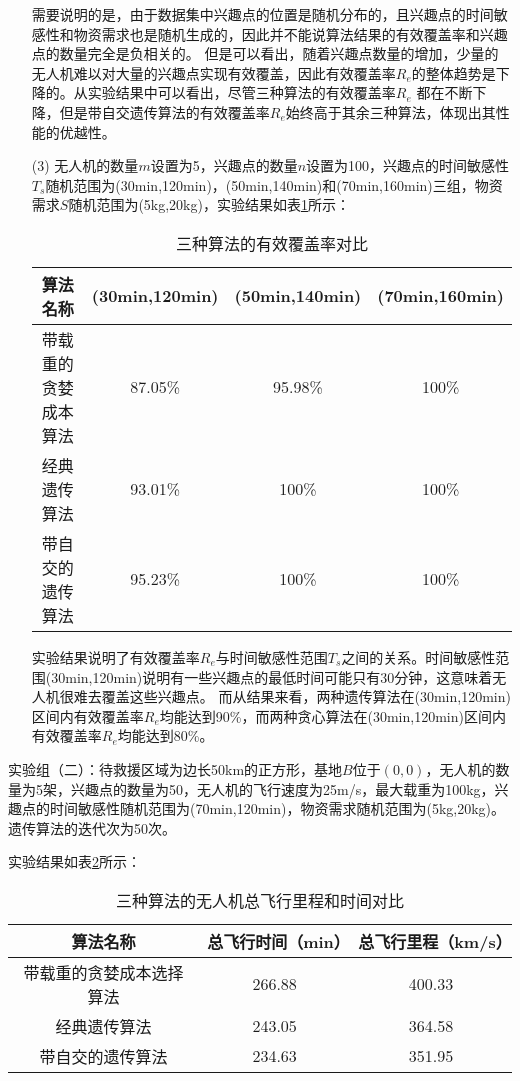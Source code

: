 \begin{itemize}
\begin{figure}[H]
        \label{fg502}
    \end{figure}
    需要说明的是，由于数据集中兴趣点的位置是随机分布的，且兴趣点的时间敏感性和物资需求也是随机生成的，因此并不能说算法结果的有效覆盖率和兴趣点的数量完全是负相关的。
    但是可以看出，随着兴趣点数量的增加，少量的无人机难以对大量的兴趣点实现有效覆盖，因此有效覆盖率$R_e$的整体趋势是下降的。从实验结果中可以看出，尽管三种算法的有效覆盖率$R_e$
    都在不断下降，但是带自交遗传算法的有效覆盖率$R_e$始终高于其余三种算法，体现出其性能的优越性。
    \item [(3)]无人机的数量$m$设置为5，兴趣点的数量$n$设置为100，兴趣点的时间敏感性$T_s$随机范围为(30min,120min)，(50min,140min)和(70min,160min)三组，物资需求$S$随机范围为(5kg,20kg)，实验结果如表\ref{table2}所示：
    \begin{table}[htbp]
        \vspace{0.5em}\centering\wuhao
        \caption{三种算法的有效覆盖率对比}\label{table2}
        \begin{tabular}{cccc}
        \toprule[1.5pt]
        算法名称 & (30min,120min) & (50min,140min) & (70min,160min) \\
        \midrule[1.5pt]
        带载重的贪婪成本 算法 & 87.05\% & 95.98\% & 100\%\\
        经典遗传算法 & 93.01\% & 100\% & 100\% \\
        带自交的遗传算法 & 95.23\% & 100\% & 100\% \\
        \bottomrule[1.5pt]
        \end{tabular}
        \end{table}
    
    
        实验结果说明了有效覆盖率$R_e$与时间敏感性范围$T_s$之间的关系。时间敏感性范围(30min,120min)说明有一些兴趣点的最低时间可能只有30分钟，这意味着无人机很难去覆盖这些兴趣点。
    而从结果来看，两种遗传算法在(30min,120min)区间内有效覆盖率$R_e$均能达到90\%，而两种贪心算法在(30min,120min)区间内有效覆盖率$R_e$均能达到80\%。
\end{itemize}


实验组（二）：待救援区域为边长50km的正方形，基地$B$位于$(0,0)$，无人机的数量为5架，兴趣点的数量为50，无人机的飞行速度为25m/s，最大载重为100kg，兴趣点的时间敏感性随机范围为(70min,120min)，物资需求随机范围为(5kg,20kg)。遗传算法的迭代次为50次。


实验结果如表\ref{table3}所示：
\begin{table}[htbp]
    \vspace{0.5em}\centering\wuhao
    \caption{三种算法的无人机总飞行里程和时间对比}\label{table3}
    \begin{tabular}{ccc}
    \toprule[1.5pt]
    算法名称 & 总飞行时间（min） & 总飞行里程（km/s） \\
    \midrule[1.5pt]
    带载重的贪婪成本选择算法 & 266.88 & 400.33 \\
    经典遗传算法 & 243.05 & 364.58 \\
    带自交的遗传算法 & 234.63 & 351.95 \\
    \bottomrule[1.5pt]
    \end{tabular}
    \end{table}


